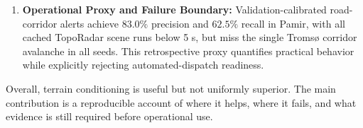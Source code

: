 \begin{enumerate}
    \item \textbf{Operational Proxy and Failure Boundary:} Validation-calibrated road-corridor alerts achieve $83.0\%$ precision and $62.5\%$ recall in Pamir, with all cached TopoRadar scene runs below 5 s, but miss the single Troms{\o} corridor avalanche in all seeds. This retrospective proxy quantifies practical behavior while explicitly rejecting automated-dispatch readiness.
\end{enumerate}

Overall, terrain conditioning is useful but not uniformly superior. The main contribution is a reproducible account of where it helps, where it fails, and what evidence is still required before operational use.
